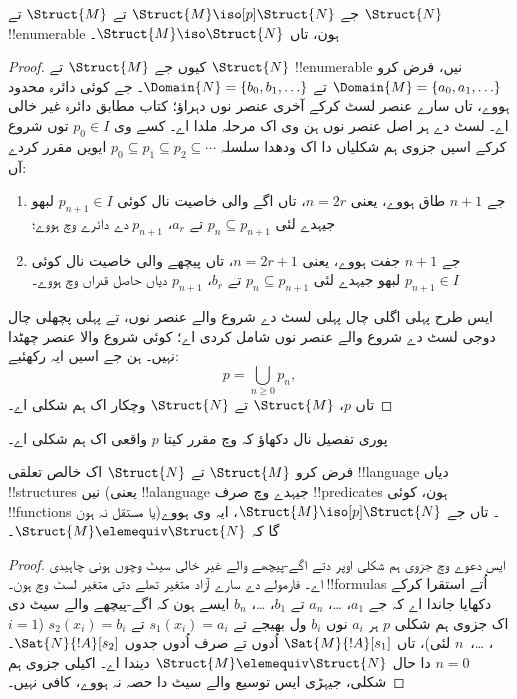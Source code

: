 \documentclass[../../../include/open-logic-section]{subfiles}
\begin{document}
\begin{thm}
  جے $\Struct{M} \iso[p] \Struct{N}$ تے $\Struct{M}$ تے
  $\Struct{N}$ !!{enumerable} ہون، تاں $\Struct{M} \iso
  \Struct{N}$۔
\end{thm}

\begin{proof}
  کیوں جے $\Struct{M}$ تے $\Struct{N}$ !!{enumerable} نیں، فرض کرو
  $\Domain{M} =
  \{a_0, a_1, \ldots \}$ تے $\Domain{N} = \{b_0, b_1, \ldots \}$۔
  جے کوئی دائرہ محدود ہووے، تاں سارے عنصر لسٹ کرکے آخری عنصر نوں دہراؤ؛
  کتاب مطابق دائرہ غیر خالی اے۔ لسٹ دے ہر اصل عنصر نوں ہن وی اک مرحلہ ملدا اے۔
  کسے وی $p_0 \in I$ توں شروع کرکے اسیں جزوی ہم شکلیاں دا
  اک ودھدا سلسلہ $p_0 \subseteq p_1 \subseteq p_2
  \subseteq \cdots$ ایویں مقرر کردے آں:
  \begin{enumerate}
  \item جے $n+1$ طاق ہووے، یعنی $n = 2r$، تاں اگے والی خاصیت
    نال کوئی $p_{n+1} \in I$ لبھو جیہدے لئی $p_n \subseteq p_{n+1}$
    تے $a_r$، $p_{n+1}$ دے دائرے وچ ہووے؛
  \item جے $n+1$ جفت ہووے، یعنی $n =2r+1$، تاں پیچھے والی خاصیت
    نال کوئی $p_{n+1} \in I$ لبھو جیہدے لئی $p_n \subseteq p_{n+1}$
    تے $b_r$، $p_{n+1}$ دیاں حاصل قدراں وچ ہووے۔
  \end{enumerate}
ایس طرح پہلی اگلی چال پہلی لسٹ دے شروع والے عنصر نوں، تے پہلی پچھلی چال
دوجی لسٹ دے شروع والے عنصر نوں شامل کردی اے؛ کوئی شروع والا عنصر چھٹدا نہیں۔
ہن جے اسیں ایہ رکھئیے:
\[
p = \bigcup_{n\ge 0} p_n,
\]
تاں $p$، $\Struct{M}$ تے $\Struct{N}$ وچکار اک ہم شکلی اے۔
\end{proof}

\begin{prob}
  پوری تفصیل نال دکھاؤ کہ
   وچ مقرر کیتا $p$ واقعی اک
  ہم شکلی اے۔
\end{prob}

\begin{thm}
  فرض کرو $\Struct{M}$ تے $\Struct{N}$ اک خالص تعلقی
  !!{language} دیاں !!{structure}s نیں (یعنی !!a{language} جیہدے
  وچ صرف !!{predicate}s ہون، کوئی !!{function}s یا مستقل نہ ہون)۔
  تاں جے $\Struct{M} \iso[p] \Struct{N}$، ایہ وی ہووے گا کہ
  $\Struct{M} \elemequiv
  \Struct{N}$۔
\end{thm}

\begin{proof}
  ایس دعوے وچ جزوی ہم شکلی اوپر دتے اگے-پیچھے والے غیر خالی سیٹ وچوں
  ہونی چاہیدی اے۔ فارمولے دے سارے آزاد متغیر تھلے دتی متغیر لسٹ وچ ہون۔
  !!{formula}s اُتے استقرا کرکے دکھایا جاندا اے کہ جے $a_1$، \dots، $a_n$ تے
  $b_1$، \dots، $b_n$ ایسے ہون کہ اگے-پیچھے والے سیٹ دی اک جزوی ہم شکلی $p$ ہر
  $a_i$ نوں $b_i$ ول بھیجے تے $s_1(x_i) =a_i$ تے $s_2(x_i) =b_i$
  ($i =1$، \dots،~$n$ لئی)، تاں $\Sat{M}{!A}[s_1]$ اُدوں تے
  صرف اُدوں جدوں $\Sat{N}{!A}[s_2]$۔ $n=0$ دا حال
  $\Struct{M} \elemequiv \Struct{N}$ دیندا اے۔
  اکیلی جزوی ہم شکلی، جیہڑی ایس توسیع والے سیٹ دا حصہ نہ ہووے، کافی نہیں۔
\end{proof}
\end{document}
